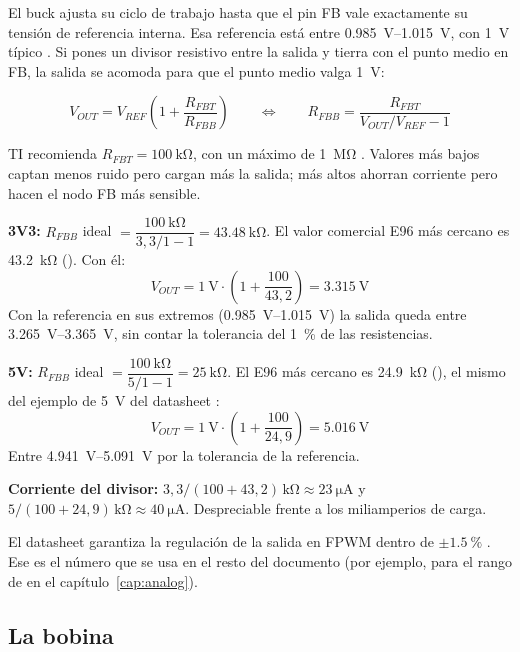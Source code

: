 El buck ajusta su ciclo de trabajo hasta que el pin FB vale exactamente su tensión de referencia interna. Esa referencia está entre \SIrange{0.985}{1.015}{\volt}, con \SI{1}{\volt} típico . Si pones un divisor resistivo entre la salida y tierra con el punto medio en FB, la salida se acomoda para que el punto medio valga \SI{1}{\volt}:

\begin{equation}
V_{OUT} = V_{REF}\left(1 + \frac{R_{FBT}}{R_{FBB}}\right)
\qquad\Longleftrightarrow\qquad
R_{FBB} = \frac{R_{FBT}}{V_{OUT}/V_{REF} - 1}
\label{eq:c02-divisor}
\end{equation}

TI recomienda $R_{FBT}=\SI{100}{\kilo\ohm}$, con un máximo de \SI{1}{\mega\ohm} . Valores más bajos captan menos ruido pero cargan más la salida; más altos ahorran corriente pero hacen el nodo FB más sensible.

\begin{calculo}
\textbf{3V3:} $R_{FBB}$ ideal $=\dfrac{\SI{100}{\kilo\ohm}}{3{,}3/1-1}=\SI{43.48}{\kilo\ohm}$. El valor comercial E96 más cercano es \SI{43.2}{\kilo\ohm} (). Con él:
\[
V_{OUT} = \SI{1}{\volt}\cdot\left(1+\frac{100}{43{,}2}\right) = \SI{3.315}{\volt}
\]
Con la referencia en sus extremos (\SIrange{0.985}{1.015}{\volt}) la salida queda entre \SIrange{3.265}{3.365}{\volt}, sin contar la tolerancia del \SI{1}{\percent} de las resistencias.

\textbf{5V:} $R_{FBB}$ ideal $=\dfrac{\SI{100}{\kilo\ohm}}{5/1-1}=\SI{25}{\kilo\ohm}$. El E96 más cercano es \SI{24.9}{\kilo\ohm} (), el mismo del ejemplo de \SI{5}{\volt} del datasheet :
\[
V_{OUT} = \SI{1}{\volt}\cdot\left(1+\frac{100}{24{,}9}\right) = \SI{5.016}{\volt}
\]
Entre \SIrange{4.941}{5.091}{\volt} por la tolerancia de la referencia.

\textbf{Corriente del divisor:} $3{,}3/(100+43{,}2)\,\si{\kilo\ohm}\approx\SI{23}{\micro\ampere}$ y $5/(100+24{,}9)\,\si{\kilo\ohm}\approx\SI{40}{\micro\ampere}$. Despreciable frente a los miliamperios de carga.
\end{calculo}

El datasheet garantiza la regulación de la salida en FPWM dentro de $\pm\SI{1.5}{\percent}$ . Ese es el número que se usa en el resto del documento (por ejemplo, para el rango de  en el capítulo~\ref{cap:analog}).

\subsection{La bobina}\label{sec:c02-bobina}


